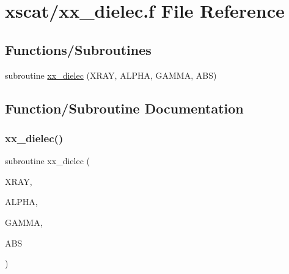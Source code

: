 \hypertarget{xx__dielec_8f}{}\section{xscat/xx\+\_\+dielec.f File Reference}
\label{xx__dielec_8f}
\subsection*{Functions/\+Subroutines}
\begin{DoxyCompactItemize}
\item 
subroutine \hyperlink{xx__dielec_8f_ac8a2c57894306669a42eb789fb159944}{xx\+\_\+dielec} (X\+R\+AY, A\+L\+P\+HA, G\+A\+M\+MA, A\+BS)
\end{DoxyCompactItemize}


\subsection{Function/\+Subroutine Documentation}
\mbox{\label{xx__dielec_8f_ac8a2c57894306669a42eb789fb159944}} 
\subsubsection{\texorpdfstring{xx\+\_\+dielec()}{xx\_dielec()}}
{\footnotesize\ttfamily subroutine xx\+\_\+dielec (\begin{DoxyParamCaption}\item[{}]{X\+R\+AY,  }\item[{}]{A\+L\+P\+HA,  }\item[{}]{G\+A\+M\+MA,  }\item[{}]{A\+BS }\end{DoxyParamCaption})}

